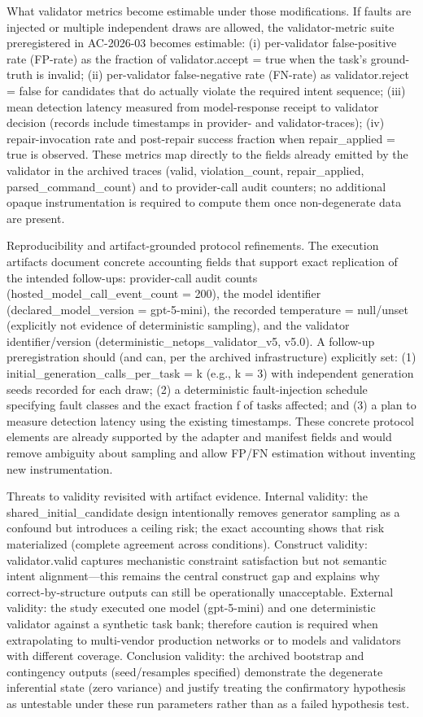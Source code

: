 \documentclass[conference]{IEEEtran}
\begin{document}
What validator metrics become estimable under those modifications. If faults are injected or multiple independent draws are allowed, the validator-metric suite preregistered in AC-2026-03 becomes estimable: (i) per-validator false-positive rate (FP-rate) as the fraction of validator.accept = true when the task's ground-truth is invalid; (ii) per-validator false-negative rate (FN-rate) as validator.reject = false for candidates that do actually violate the required intent sequence; (iii) mean detection latency measured from model-response receipt to validator decision (records include timestamps in provider- and validator-traces); (iv) repair-invocation rate and post-repair success fraction when repair\_applied = true is observed. These metrics map directly to the fields already emitted by the validator in the archived traces (valid, violation\_count, repair\_applied, parsed\_command\_count) and to provider-call audit counters; no additional opaque instrumentation is required to compute them once non-degenerate data are present.

Reproducibility and artifact-grounded protocol refinements. The execution artifacts document concrete accounting fields that support exact replication of the intended follow-ups: provider-call audit counts (hosted\_model\_call\_event\_count = 200), the model identifier (declared\_model\_version = gpt-5-mini), the recorded temperature = null/unset (explicitly not evidence of deterministic sampling), and the validator identifier/version (deterministic\_netops\_validator\_v5, v5.0). A follow-up preregistration should (and can, per the archived infrastructure) explicitly set: (1) initial\_generation\_calls\_per\_task = k (e.g., k = 3) with independent generation seeds recorded for each draw; (2) a deterministic fault-injection schedule specifying fault classes and the exact fraction f of tasks affected; and (3) a plan to measure detection latency using the existing timestamps. These concrete protocol elements are already supported by the adapter and manifest fields and would remove ambiguity about sampling and allow FP/FN estimation without inventing new instrumentation.

Threats to validity revisited with artifact evidence. Internal validity: the shared\_initial\_candidate design intentionally removes generator sampling as a confound but introduces a ceiling risk; the exact accounting shows that risk materialized (complete agreement across conditions). Construct validity: validator.valid captures mechanistic constraint satisfaction but not semantic intent alignment---this remains the central construct gap and explains why correct-by-structure outputs can still be operationally unacceptable. External validity: the study executed one model (gpt-5-mini) and one deterministic validator against a synthetic task bank; therefore caution is required when extrapolating to multi-vendor production networks or to models and validators with different coverage. Conclusion validity: the archived bootstrap and contingency outputs (seed/resamples specified) demonstrate the degenerate inferential state (zero variance) and justify treating the confirmatory hypothesis as untestable under these run parameters rather than as a failed hypothesis test.
\end{document}
